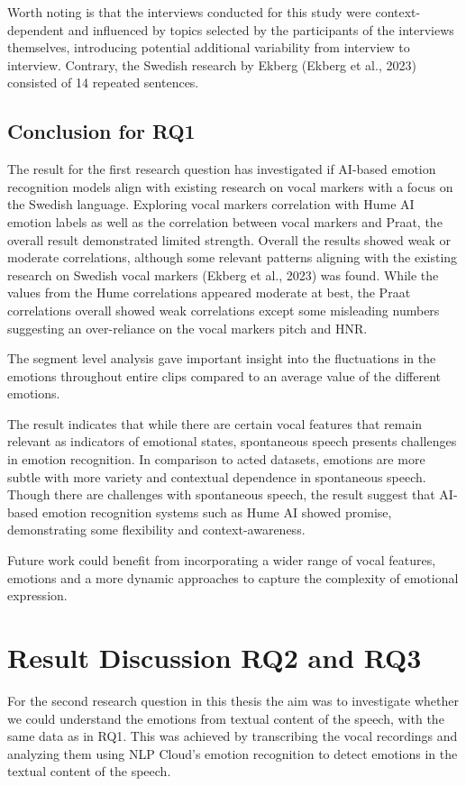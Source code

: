 Worth noting is that the interviews conducted for this study were context-dependent and influenced by topics selected by the participants of the interviews themselves, introducing potential additional variability from interview to interview. Contrary, the Swedish research by Ekberg (Ekberg et al., 2023) consisted of 14 repeated sentences.

\subsection{Conclusion for RQ1}
The result for the first research question has investigated if AI-based emotion recognition models align with existing research on vocal markers with a focus on the Swedish language.
Exploring vocal markers correlation with Hume AI emotion labels as well as the correlation between vocal markers and Praat, the overall result demonstrated limited strength.
Overall the results showed weak or moderate correlations, although some relevant patterns aligning with the existing research on Swedish vocal markers (Ekberg et al., 2023) was found.
While the values from the Hume correlations appeared moderate at best, the Praat correlations overall showed weak correlations except some misleading numbers suggesting an over-reliance on the vocal markers pitch and HNR.

The segment level analysis gave important insight into the fluctuations in the emotions throughout entire clips compared to an average value of the different emotions.

The result indicates that while there are certain vocal features that remain relevant as indicators of emotional states, spontaneous speech presents challenges in emotion recognition. In comparison to acted datasets, emotions are more subtle with more variety and contextual dependence in spontaneous speech.
Though there are challenges with spontaneous speech, the result suggest that AI-based emotion recognition systems such as Hume AI showed promise, demonstrating some flexibility and context-awareness.

Future work could benefit from incorporating a wider range of vocal features, emotions and a more dynamic approaches to capture the complexity of emotional expression.

\section{Result Discussion RQ2 and RQ3}
For the second research question in this thesis the aim was to investigate whether we could understand the emotions from textual content of the speech, with the same data as in RQ1. This was achieved by transcribing the vocal recordings and analyzing them using NLP Cloud’s emotion recognition to detect emotions in the textual content of the speech.

